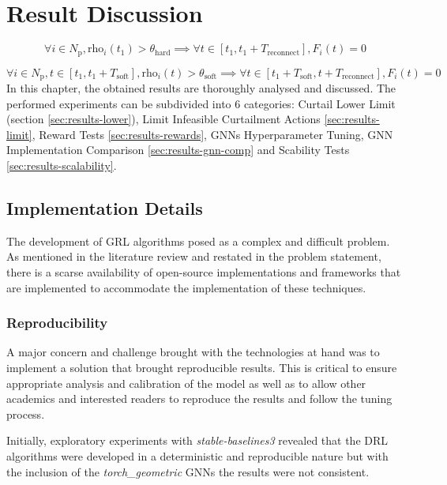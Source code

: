 \chapter{Result Discussion} \label{chap:results}
\begin{equation}
	\forall i \in N_\text{p}, \text{rho}_i (t_1) > \theta_\text{hard} \implies \forall t \in [t_1, t_1 + T_\text{reconnect}], F_i (t) = 0
\end{equation}

\begin{equation}
	\forall i \in N_\text{p}, t \in [t_1, t_1 + T_\text{soft}], \text{rho}_i (t) > \theta_\text{soft} \implies \forall t \in [t_1 + T_\text{soft}, t + T_\text{reconnect}], F_i (t)= 0
\end{equation}
In this chapter, the obtained results are thoroughly analysed and discussed. The performed experiments can be subdivided into 6 categories: Curtail Lower Limit (section \ref{sec:results-lower}), Limit Infeasible Curtailment Actions \ref{sec:results-limit}, Reward Tests \ref{sec:results-rewards}, \acp{GNN} Hyperparameter Tuning, \ac{GNN} Implementation Comparison \ref{sec:results-gnn-comp} and Scability Tests \ref{sec:results-scalability}.

\section{Implementation Details} \label{sec:results-implementation}

The development of \ac{GRL} algorithms posed as a complex and difficult problem. As mentioned in the literature review and restated in the problem statement, there is a scarse availability of open-source implementations and frameworks that are implemented to accommodate the implementation of these techniques. 

\subsection{Reproducibility}

A major concern and challenge brought with the technologies at hand was to implement a solution that brought reproducible results. This is critical to ensure appropriate analysis and calibration of the model as well as to allow other academics and interested readers to reproduce the results and follow the tuning process. \par

Initially, exploratory experiments with \textit{stable-baselines3} revealed that the \ac{DRL} algorithms were developed in a deterministic and reproducible nature but with the inclusion of the \textit{torch\_geometric}  \acp{GNN} the results were not consistent. \par

